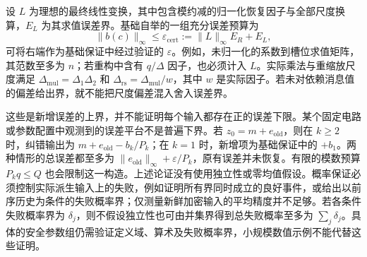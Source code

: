 设 $L$ 为理想的最终线性变换，其中包含模约减的归一化恢复因子与全部尺度换算，$E_L$ 为其求值误差界。基础自举的一组充分误差预算为
\[
\|b(c)\|_\infty\leq\varepsilon_{\mathrm{cert}}:=\|L\|_\infty E_R+E_L,
\]
可将右端作为基础保证中经过验证的 $\varepsilon$。例如，未归一化的系数到槽位求值矩阵，其范数至多为 $n$；若重构中含有 $q/\Delta$ 因子，也必须计入 $L$。实际乘法与重缩放尺度满足 $\Delta_{\mathrm{mul}}=\Delta_1\Delta_2$ 和 $\Delta_{\mathrm{rs}}=\Delta_{\mathrm{mul}}/w$，其中 $w$ 是实际因子。若未对依赖消息值的偏差给出界，就不能把尺度偏差混入舍入误差界。

这些是新增误差的上界，并不能证明每个输入都存在正的误差下限。某个固定电路或参数配置中观测到的误差平台不是普遍下界。若 $z_0=m+e_{\mathrm{old}}$，则在 $k\geq2$ 时，纠错输出为 $m+e_{\mathrm{old}}-b_k/P_k$；在 $k=1$ 时，新增项为基础保证中的 $+b_1$。两种情形的总误差都至多为 $\|e_{\mathrm{old}}\|_\infty+\varepsilon/P_k$，原有误差并未恢复。有限的模数预算 $P_kq\leq Q$ 也会限制这一构造。上述论证没有使用独立性或零均值假设。概率保证必须控制实际派生输入上的失败，例如证明所有界同时成立的良好事件，或给出以前序历史为条件的失败概率界；仅测量新鲜加密输入的平均精度并不足够。若各条件失败概率界为 $\delta_j$，则不假设独立性也可由并集界得到总失败概率至多为 $\sum_j\delta_j$。具体的安全参数组仍需验证定义域、算术及失败概率界，小规模数值示例不能代替这些证明。


